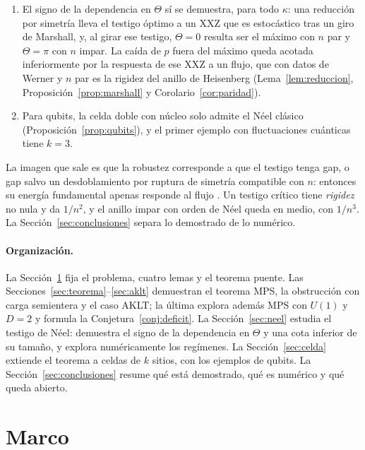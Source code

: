 \documentclass[11pt,a4paper]{article}
\theoremstyle{remark}
\begin{document}
\begin{enumerate}
  (Proposición~\ref{prop:limite} y la longitud de correlación de \cite{jkm}).
\item El signo de la dependencia en $\Theta$ sí se demuestra, para todo $\kappa$: una reducción por
  simetría lleva el testigo óptimo a un XXZ que es estocástico tras un giro de Marshall, y,
  al girar ese testigo, $\Theta=0$ resulta ser el máximo con $n$ par y $\Theta=\pi$ con $n$ impar. La caída
  de $p$ fuera del máximo queda acotada inferiormente por la respuesta de ese XXZ a un flujo, que con datos de Werner y $n$ par es la rigidez
  del anillo de Heisenberg (Lema~\ref{lem:reduccion}, Proposición~\ref{prop:marshall} y
  Corolario~\ref{cor:paridad}).
\item Para qubits, la celda doble con núcleo solo admite el Néel clásico
  (Proposición~\ref{prop:qubits}), y el primer ejemplo con fluctuaciones cuánticas tiene $k=3$.
\end{enumerate}

La imagen que sale es que la robustez corresponde a que el testigo tenga gap, o gap salvo un
desdoblamiento por ruptura de simetría compatible con $n$: entonces su energía fundamental apenas
responde al flujo \cite{kohn,watanabe}. Un testigo crítico tiene \emph{rigidez} no nula
\cite{shastry} y da $1/n^2$, y el anillo impar con orden de Néel queda en medio, con $1/n^3$. La
Sección~\ref{sec:conclusiones} separa lo demostrado de lo numérico.

\paragraph{Organización.} La Sección~\ref{sec:marco} fija el problema, cuatro lemas y el teorema
puente. Las
Secciones~\ref{sec:teorema}--\ref{sec:aklt} demuestran el teorema MPS, la obstrucción con carga
semientera y el caso AKLT; la última explora además MPS con $U(1)$ y $D=2$ y formula la
Conjetura~\ref{conj:deficit}. La Sección~\ref{sec:neel} estudia el testigo de Néel: demuestra el signo de la dependencia en
$\Theta$ y una cota inferior de su tamaño, y explora numéricamente los regímenes. La
Sección~\ref{sec:celda} extiende el teorema a celdas de $k$ sitios, con los ejemplos de qubits. La
Sección~\ref{sec:conclusiones} resume qué está demostrado, qué es numérico y qué queda abierto.

\section{Marco}\label{sec:marco}
\end{document}
